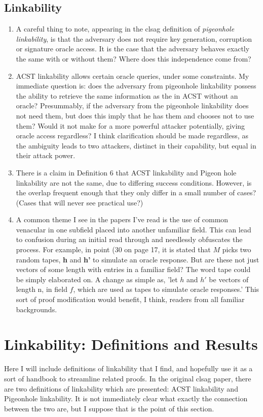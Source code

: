 \documentclass[12pt,titlepage]{article}
\begin{document}
\subsection{Linkability}
\begin{enumerate}
\item A careful thing to note, appearing in the clsag definition of \textit{pigeonhole linkability}, is that the adversary does not require key generation, corruption or signature oracle access. It is the case that the adversary behaves exactly the same with or without them? Where does this independence come from?
\item ACST linkability allows certain oracle queries, under some constraints. My immediate question is: does the adversary from pigeonhole linkability possess the ability to retrieve the same information as the in ACST without an oracle? Presummably, if the adversary from the pigeonhole linkability does not need them, but does this imply that he has them and chooses not to use them? Would it not make for a more powerful attacker potentially, giving oracle access regardless? I think clarification should be made regardless, as the ambiguity leads to two attackers, distinct in their capability, but equal in their attack power.
\item There is a claim in Definition 6 that ACST linkability and Pigeon hole linkability are not the same, due to differing success conditions. However, is the overlap frequent enough that they only differ in a small number of cases? (Cases that will never see practical use?)
\item A common theme I see in the papers I've read is the use of common venacular in one subfield placed into another unfamiliar field. This can lead to confusion during an initial read through and needlessly obfuscates the process. For example, in point (30 on page 17, it is stated that $M$ picks two random tapes, \textbf{h} and \textbf{h'} to simulate an oracle response. But are these not just vectors of some length with entries in a familiar field? The word tape could be simply elaborated on. A change as simple as, 'let $h$ and $h'$ be vectors of length n, in field $f$, which are used as tapes to simulate oracle responses.' This sort of proof modification would benefit, I think, readers from all familiar backgrounds.
\end{enumerate}



\newpage
\section{Linkability: Definitions and Results}
Here I will include definitions of linkability that I find, and hopefully use it as a sort of handbook to streamline related proofs. In the original clsag paper, there are two definitions of linkability which are presented: ACST linkability and Pigeonhole linkability. It is not immediately clear what exactly the connection between the two are, but I suppose that is the point of this section.
\end{document}

